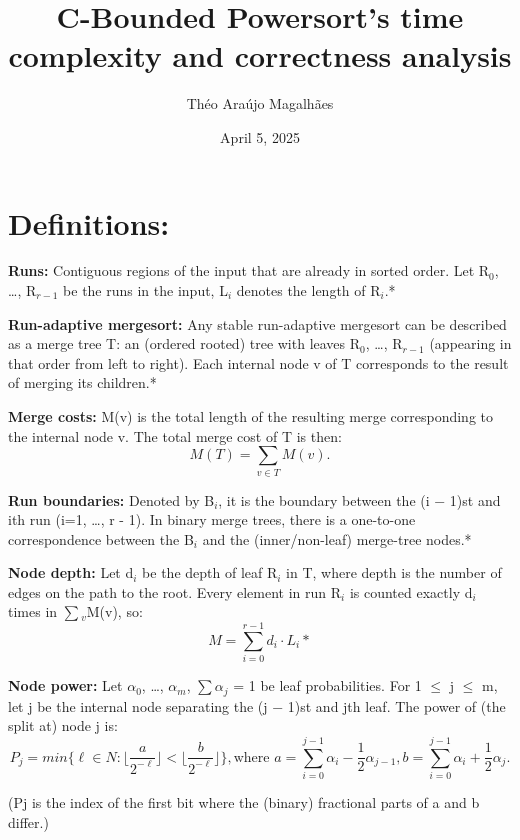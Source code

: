 \documentclass{article}
\title{\textbf{C-Bounded Powersort's time complexity and correctness analysis}}
\author{Théo Araújo Magalhães}
\date{April 5, 2025}
\begin{document}
\maketitle
\section*{Definitions:}
\textbf{Runs:} Contiguous regions of the input that are already in sorted order. Let R$_0$, \dots , R$_{r-1}$ be the runs in the input, L$_i$ denotes the length of R$_i$.*

\textbf{Run-adaptive mergesort:} Any stable run-adaptive mergesort can be described as a merge tree T: an (ordered rooted) tree with leaves R$_0$, \dots, R$_{r-1}$ (appearing in that order from left to right). Each internal node v of T corresponds to the result of merging its children.*

\textbf{Merge costs:} M(v) is the total length of the resulting merge corresponding to the internal node v. The total merge cost of T is then:
\begin{equation}
M(T) = \sum_{v \in T}M(v).     
\end{equation}

\textbf{Run boundaries:} Denoted by B$_i$, it is the boundary between the (i − 1)st and ith run (i=1, \dots, r - 1). In binary merge trees, there is a one-to-one correspondence between the B$_i$ and the (inner/non-leaf) merge-tree nodes.*

\textbf{Node depth:} Let d$_i$ be the depth of leaf R$_i$ in T, where depth is the number of edges on the path to the root. Every element in run R$_i$ is counted exactly d$_i$ times in $\sum$$_v$M(v), so: 
\begin{equation}
        M = \sum^{r-1}_{i=0}d_i \cdot L_i*    
\end{equation}

\textbf{Node power:} Let $\alpha$$_0$, \dots, $\alpha$$_m$, $\sum$$\alpha$$_j$ = 1 be leaf probabilities. For 1 $\le$ j $\le$ m, let j be the internal node separating the (j − 1)st and jth leaf. The power of (the split at) node j is:
\begin{equation}
    P_j = min\{ \ell \in N: \lfloor{\frac{a}{2^{-\ell}}}\rfloor   < \lfloor{\frac{b}{2^{-\ell}}}\rfloor \}, \text{where } a = \sum_{i=0}^{j-1} \alpha_i - \frac{1}{2}\alpha_{j-1}, b = \sum_{i=0}^{j-1} \alpha_i + \frac{1}{2}\alpha_j.
\end{equation}

(Pj is the index of the first bit where the (binary) fractional parts of a and b differ.)
\end{document}
